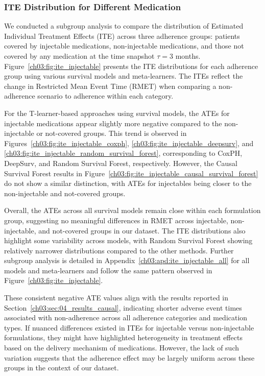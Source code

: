 \subsubsection{ITE Distribution for Different Medication}
\label{ch03:sec:04_results_ite_analysis}

We conducted a subgroup analysis to compare the distribution of Estimated Individual Treatment Effects (ITE) across three adherence groups: patients covered by injectable medications, non-injectable medications, and those not covered by any medication at the time snapshot \(\tau=3\) months.
Figure~\ref{ch03:fig:ite_injectable} presents the ITE distributions for each adherence group using various survival models and meta-learners.
The ITEs reflect the change in Restricted Mean Event Time (RMET) when comparing a non-adherence scenario to adherence within each category.

For the T-learner-based approaches using survival models, the ATEs for injectable medications appear slightly more negative compared to the non-injectable or not-covered groups.
This trend is observed in Figures~\ref{ch03:fig:ite_injectable_coxph}, \ref{ch03:fig:ite_injectable_deepsurv}, and \ref{ch03:fig:ite_injectable_random_survival_forest}, corresponding to CoxPH, DeepSurv, and Random Survival Forest, respectively.
However, the Causal Survival Forest results in Figure~\ref{ch03:fig:ite_injectable_causal_survival_forest} do not show a similar distinction, with ATEs for injectables being closer to the non-injectable and not-covered groups.

Overall, the ATEs across all survival models remain close within each formulation group, suggesting no meaningful differences in RMET across injectable, non-injectable, and not-covered groups in our dataset.
The ITE distributions also highlight some variability across models, with Random Survival Forest showing relatively narrower distributions compared to the other methods.
Further subgroup analysis is detailed in Appendix~\ref{ch03:apd:ite_injectable_all} for all models and meta-learners and follow the same pattern observed in Figure~\ref{ch03:fig:ite_injectable}.

These consistent negative ATE values align with the results reported in Section~\ref{ch03:sec:04_results_causal}, indicating shorter adverse event times associated with non-adherence across all adherence categories and medication types.
If nuanced differences existed in ITEs for injectable versus non-injectable formulations, they might have highlighted heterogeneity in treatment effects based on the delivery mechanism of medications.
However, the lack of such variation suggests that the adherence effect may be largely uniform across these groups in the context of our dataset.

